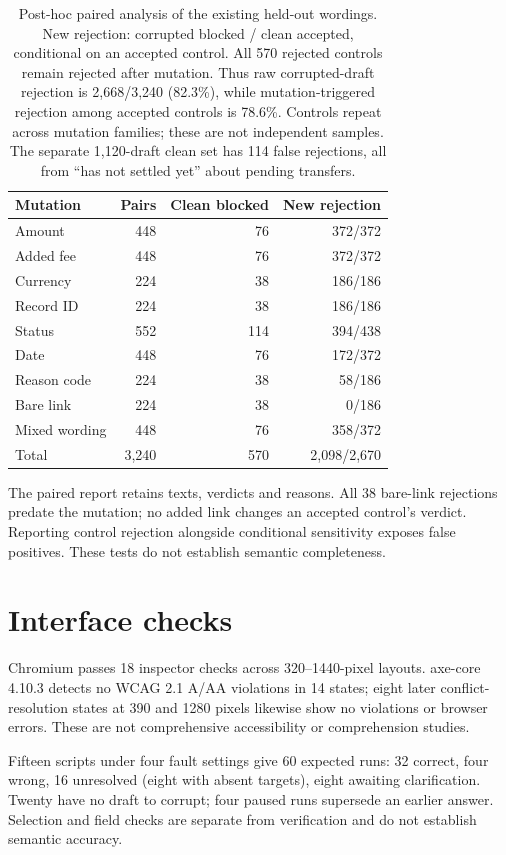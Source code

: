 \documentclass[11pt]{article}
\begin{document}
\begin{table}[H]
\centering\small
\setlength{\tabcolsep}{3pt}
\begin{tabular}{@{}lrrr@{}}
\toprule
Mutation & Pairs & Clean blocked & New rejection \\
\midrule
Amount & 448 & 76 & 372/372 \\
Added fee & 448 & 76 & 372/372 \\
Currency & 224 & 38 & 186/186 \\
Record ID & 224 & 38 & 186/186 \\
Status & 552 & 114 & 394/438 \\
Date & 448 & 76 & 172/372 \\
Reason code & 224 & 38 & 58/186 \\
Bare link & 224 & 38 & 0/186 \\
Mixed wording & 448 & 76 & 358/372 \\
\midrule
Total & 3,240 & 570 & 2,098/2,670 \\
\bottomrule
\end{tabular}
\caption{Post-hoc paired analysis of the existing held-out wordings. New rejection: corrupted
blocked / clean accepted, conditional on an accepted control. All 570 rejected controls remain
rejected after mutation. Thus raw corrupted-draft rejection is 2,668/3,240 (82.3\%), while
mutation-triggered rejection among accepted controls is 78.6\%. Controls repeat across mutation
families; these are not independent samples. The separate 1,120-draft clean set has 114 false
rejections, all from ``has not settled yet'' about pending transfers.}
\label{tab:inject}
\end{table}

The paired report retains texts, verdicts and reasons. All 38 bare-link rejections predate
the mutation; no added link changes an accepted control's verdict. Reporting control rejection
alongside conditional sensitivity exposes false positives. These tests do not establish semantic completeness.

\section{Interface checks}
\label{app:ui}

Chromium passes 18 inspector checks across 320--1440-pixel layouts. axe-core 4.10.3 detects
no WCAG 2.1 A/AA violations in 14 states; eight later conflict-resolution states at 390 and
1280 pixels likewise show no violations or browser errors. These are not comprehensive
accessibility or comprehension studies.

Fifteen scripts under four fault settings give 60 expected runs: 32 correct, four wrong,
16 unresolved (eight with absent targets), eight awaiting clarification. Twenty have no draft
to corrupt; four paused runs supersede an earlier answer. Selection and field checks are
separate from verification and do not establish semantic accuracy.
\end{document}
